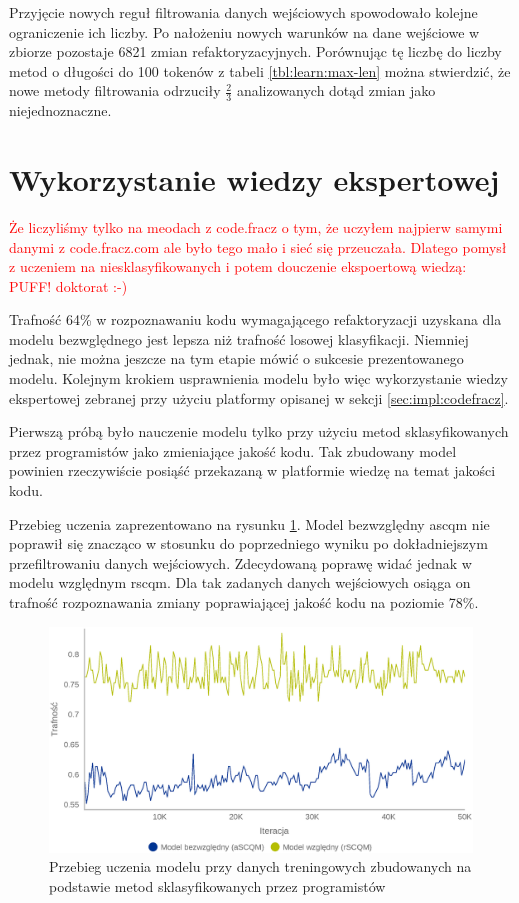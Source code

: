 \documentclass[12pt]{report}
\begin{document}
Przyjęcie nowych reguł filtrowania danych wejściowych spowodowało kolejne ograniczenie ich liczby. Po nałożeniu nowych warunków na dane wejściowe w zbiorze pozostaje 6821 zmian refaktoryzacyjnych. Porównując tę liczbę do liczby metod o długości do 100 tokenów z tabeli \ref{tbl:learn:max-len} można stwierdzić, że nowe metody filtrowania odrzuciły $\frac23$ analizowanych dotąd zmian jako niejednoznaczne.

\section{Wykorzystanie wiedzy ekspertowej}
\label{sec:learn:expert}
\textcolor{red}{Że liczyliśmy tylko na meodach z code.fracz}
\textcolor{red}{o tym, że uczyłem najpierw samymi danymi z code.fracz.com ale było tego mało i sieć się przeuczała. Dlatego pomysł z uczeniem na niesklasyfikowanych i potem douczenie ekspoertową wiedzą: PUFF! doktorat :-)}

Trafność 64\% w rozpoznawaniu kodu wymagającego refaktoryzacji uzyskana dla modelu bezwględnego jest lepsza niż trafność losowej klasyfikacji. Niemniej jednak, nie można jeszcze na tym etapie mówić o sukcesie prezentowanego modelu. Kolejnym krokiem usprawnienia modelu było więc wykorzystanie wiedzy ekspertowej zebranej przy użyciu platformy opisanej w sekcji \ref{sec:impl:codefracz}.

Pierwszą próbą było nauczenie modelu tylko przy użyciu metod sklasyfikowanych przez programistów jako zmieniające jakość kodu. Tak zbudowany model powinien rzeczywiście posiąść przekazaną w platformie wiedzę na temat jakości kodu.

Przebieg uczenia zaprezentowano na rysunku \ref{fig:learn:expert}. Model bezwzględny \gls{ascqm} nie poprawił się znacząco w stosunku do poprzedniego wyniku po dokładniejszym przefiltrowaniu danych wejściowych. Zdecydowaną poprawę widać jednak w modelu względnym \gls{rscqm}. Dla tak zadanych danych wejściowych osiąga on trafność rozpoznawania zmiany poprawiającej jakość kodu na poziomie 78\%.

\begin{figure}
\centering
\includegraphics[width=\textwidth]{learn/expert-only.eps}
\caption{Przebieg uczenia modelu przy danych treningowych zbudowanych na podstawie metod sklasyfikowanych przez programistów}
\label{fig:learn:expert}
\end{figure}
\end{document}
